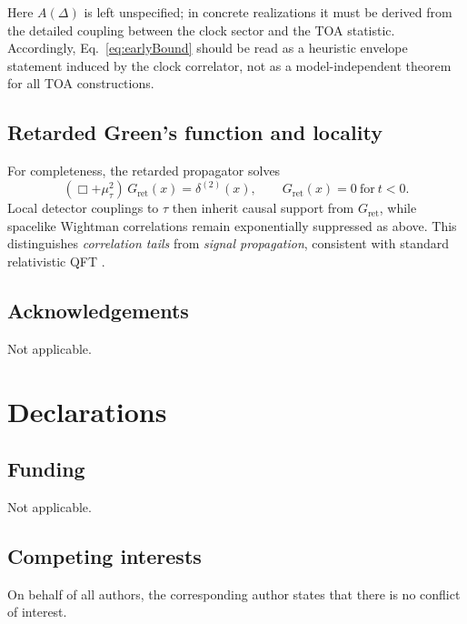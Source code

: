 \documentclass[11pt, a4paper]{article}
\theoremstyle{definition}
\theoremstyle{plain}
\theoremstyle{remark}
\numberwithin{equation}{section}
\newcommand{\Gret}{G_{\mathrm{ret}}}
\begin{document}
        Here $A(\Delta)$ is left unspecified; in concrete realizations it must be derived from the detailed coupling between the clock sector and the TOA statistic. Accordingly, Eq.~\eqref{eq:earlyBound} should be read as a heuristic envelope statement induced by the clock correlator, not as a model-independent theorem for all TOA constructions.
    
    \subsection{Retarded Green's function and locality}
        
        For completeness, the retarded propagator solves
        \begin{equation}
            (\Box+\mu_\tau^2)\,\Gret(x)=\delta^{(2)}(x),
            \qquad \Gret(x)=0\ \text{for}\ t<0.
        \end{equation}
        Local detector couplings to $\tau$ then inherit causal support from $\Gret$, while spacelike Wightman correlations remain exponentially suppressed as above. This distinguishes \emph{correlation tails} from \emph{signal propagation}, consistent with standard relativistic QFT \cite{Peskin1995,Weinberg1995}.

        
        \hypersetup{bookmarksdepth=1}
        \providecommand{\backmatter}{}
        \backmatter

        \subsection*{Acknowledgements}
        Not applicable.

        \section*{Declarations}
    
    \subsection*{Funding}
        Not applicable.
    
    \subsection*{Competing interests}
        On behalf of all authors, the corresponding author states that there is no conflict of interest.
    
\end{document}
